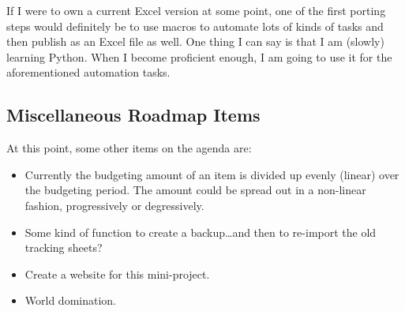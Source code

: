 If I were to own a current Excel version at some point, one of the first porting steps would definitely be to use macros to automate lots of kinds of tasks and then publish \tfn as an Excel file as well.
One thing I can say is that I am (slowly) learning Python.
When I become proficient enough, I am going to use it for the aforementioned automation tasks.

\subsection{Miscellaneous Roadmap Items}
\label{subsec:misc-roadmap-items}

At this point, some other items on the agenda are:
\begin{itemize}
	\item Currently the budgeting amount of an item is divided up evenly (\ie linear) over the budgeting period.
	The amount could be spread out in a non-linear fashion, \eg progressively or degressively.
	\item Some kind of function to create a backup\ldots and then to re-import the old tracking sheets?
	\item Create a website for this mini-project.
	\item World domination.
\end{itemize}

